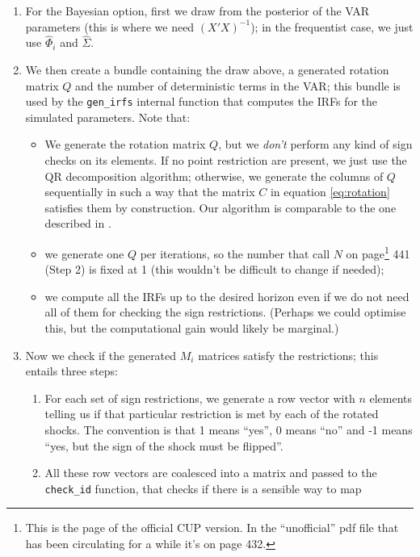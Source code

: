 \documentclass[a4paper,10pt]{article}
\begin{document}
\begin{enumerate}
\item For the Bayesian option, first we draw from the posterior of the
  VAR parameters (this is where we need $(X'X)^{-1}$); in the
  frequentist case, we just use $\hat{\Phi}_i$ and $\hat{\Sigma}$.
\item We then create a bundle containing the draw above, a generated rotation
  matrix $Q$ and the number of deterministic terms in the VAR; this bundle is
  used by the \verb|gen_irfs| internal function that computes the IRFs for the
  simulated parameters. Note that:
  \begin{itemize}
  \item We generate the rotation matrix $Q$, but we \emph{don't} perform any
    kind of sign checks on its elements. If no point restriction are present, we
    just use the QR decomposition algorithm; otherwise, we generate the columns
    of $Q$ sequentially in such a way that the matrix $C$ in equation
    \eqref{eq:rotation} satisfies them by construction. Our algorithm is
    comparable to the one described in \cite{AriasEtAl2018}.
  \item we generate one $Q$ per iterations, so the number that
    \citet{KilianLuetkepohl2017book} call $N$ on page\footnote{This is the page
      of the official CUP version. In the ``unofficial'' pdf file that has been
      circulating for a while it's on page 432.} 441 (Step 2) is fixed at 1
    (this wouldn't be difficult to change if needed);
  \item we compute all the IRFs up to the desired horizon even if we do not need
    all of them for checking the sign restrictions.  (Perhaps we could optimise
    this, but the computational gain would likely be marginal.)
    \end{itemize}
  \item Now we check if the generated $M_i$ matrices satisfy the restrictions;
    this entails three steps:
    \begin{enumerate}
    \item For each set of sign restrictions, we generate a row vector with $n$
      elements telling us if that particular restriction is met by each of the
      rotated shocks. The convention is that 1 means ``yes'', 0 means ``no'' and
      -1 means ``yes, but the sign of the shock must be flipped''.
    \item All these row vectors are coalesced into a matrix and passed to the
      \verb|check_id| function, that checks if there is a sensible way to map

\end{enumerate}
\end{enumerate}
\end{document}
